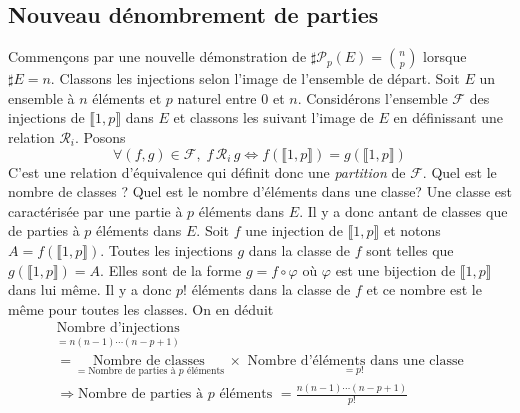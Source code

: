 \begin{demo}
\subsection{Nouveau dénombrement de parties}
Commençons par une nouvelle démonstration de $\sharp \mathcal{P}_p(E) = \binom{n}{p}$ lorsque $\sharp E = n$.\newline
Classons les injections selon l'image de l'ensemble de départ.\newline
Soit $E$ un ensemble à $n$ éléments et $p$ naturel entre $0$ et $n$. Considérons l'ensemble $\mathcal{F}$ des injections de $\llbracket 1,p \rrbracket $ dans $E$ et classons les suivant l'image de $E$ en définissant une relation $\mathcal{R}_i$. Posons
\begin{displaymath}
 \forall(f,g) \in \mathcal{F},\;  f \,\mathcal{R}_i \,g \Leftrightarrow f(\llbracket 1,p \rrbracket) = g(\llbracket 1,p \rrbracket)
\end{displaymath}
C'est une relation d'équivalence qui définit donc une \emph{partition} de $\mathcal{F}$.\newline
Quel est le nombre de classes ? Quel est le nombre d'éléments dans une classe?\newline
Une classe est caractérisée par une partie à $p$ éléments dans $E$. Il y a donc antant de classes que de parties à $p$ éléments dans $E$.\newline
Soit $f$ une injection de $\llbracket 1,p \rrbracket $ et notons  $A=f(\llbracket 1,p \rrbracket)$. Toutes les injections $g$ dans la classe de $f$ sont telles que $g(\llbracket 1,p \rrbracket )=A$. Elles sont de la forme $g=f \circ \varphi$ où $\varphi$ est une bijection de $\llbracket 1,p \rrbracket $ dans lui même. Il y a donc $p!$ éléments dans la classe de $f$ et ce nombre est le même pour toutes les classes.\newline
On en déduit
\begin{multline*}
 \underset{=n(n-1)\cdots(n-p+1)}{\text{Nombre d'injections}} \\
 =
 \underset{=\text{Nombre de parties à $p$ éléments }}{\text{Nombre de classes }}
\times 
\underset{=p!}{\text{ Nombre d'éléments dans une classe}}\\
\Rightarrow
\text{Nombre de parties à $p$ éléments } = \frac{n(n-1)\cdots(n-p+1)}{p!}
\end{multline*}
\end{demo}
\clearpage
